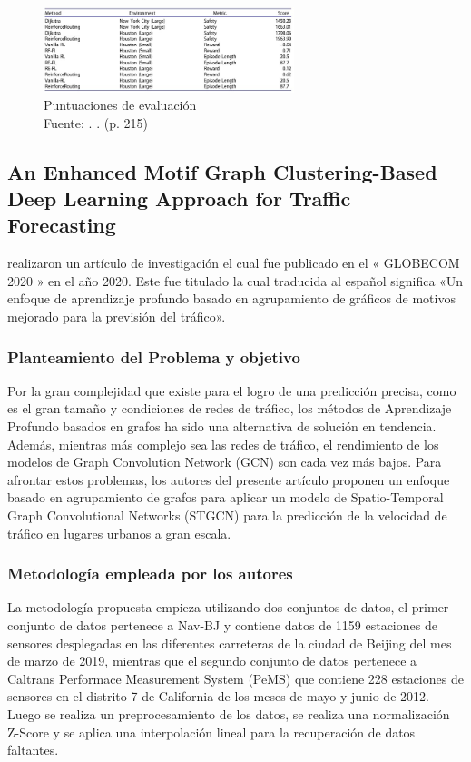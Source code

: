 \begin{figure}[h]
	\begin{center}
		\includegraphics[width=0.65\textwidth]{2/figures/resultN.jpg}
		\caption{Puntuaciones de evaluación \\
			Fuente: \citep*{pr_de}. . (p. 215)}
		\label{1:fig2}
	\end{center}
\end{figure}


\subsection{An Enhanced Motif Graph Clustering-Based Deep Learning Approach for Traffic Forecasting \citep*{pr_zhang}}
\citeauthor{pr_zhang} realizaron un artículo de investigación el cual fue publicado en el « GLOBECOM 2020 » en el año 2020. Este fue titulado  la cual traducida al español significa «Un enfoque de aprendizaje profundo basado en agrupamiento de gráficos de motivos mejorado para la previsión del tráfico».

\subsubsection{Planteamiento del Problema y objetivo }
Por la gran complejidad que existe para el logro de una predicción precisa, como es el gran tamaño y condiciones de redes de tráfico, los métodos de Aprendizaje Profundo basados en grafos ha sido una alternativa de solución en tendencia. Además, mientras más complejo sea las redes de tráfico, el rendimiento de los modelos de Graph Convolution Network (GCN) son cada vez más bajos. Para afrontar estos problemas, los autores del presente artículo proponen un enfoque basado en agrupamiento de grafos para aplicar un modelo de Spatio-Temporal Graph Convolutional Networks (STGCN) para la predicción de la velocidad de tráfico en lugares urbanos a gran escala.

\subsubsection{Metodología empleada por los autores}
La metodología propuesta empieza utilizando dos conjuntos de datos, el primer conjunto de datos pertenece a Nav-BJ y contiene datos de 1159 estaciones de sensores desplegadas en las diferentes carreteras de la ciudad de Beijing del mes de marzo de 2019, mientras que el segundo conjunto de datos pertenece a Caltrans Performace Measurement System (PeMS) que contiene 228 estaciones de sensores en el distrito 7 de California de los meses de mayo y junio de 2012. Luego se realiza un preprocesamiento de los datos, se realiza una normalización Z-Score y se aplica una interpolación lineal para la recuperación de datos faltantes. 

